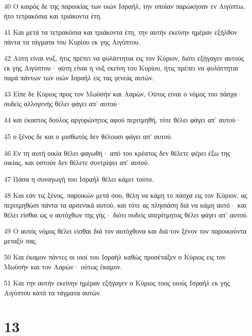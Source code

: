 \par 40 Ο καιρός δε της παροικίας των υιών Ισραήλ, την οποίαν παρώκησαν εν Αιγύπτω, ήτο τετρακόσια και τριάκοντα έτη.
\par 41 Και μετά τα τετρακόσια και τριάκοντα έτη, την αυτήν εκείνην ημέραν εξήλθον πάντα τα τάγματα του Κυρίου εκ γης Αιγύπτου.
\par 42 Αύτη είναι νυξ, ήτις πρέπει να φυλάττηται εις τον Κύριον, διότι εξήγαγεν αυτούς εκ γης Αιγύπτου· αύτη είναι η νυξ εκείνη του Κυρίου, ήτις πρέπει να φυλάττηται παρά πάντων των υιών Ισραήλ εις τας γενεάς αυτών.
\par 43 Είπε δε Κύριος προς τον Μωϋσήν και Ααρών, Ούτος είναι ο νόμος του πάσχα· ουδείς αλλογενής θέλει φάγει απ' αυτού·
\par 44 και έκαστος δούλος αργυρώνητος αφού περιτμηθή, τότε θέλει φάγει απ' αυτού·
\par 45 ο ξένος δε και ο μισθωτός δεν θέλουσι φάγει απ' αυτού.
\par 46 Εν τη αυτή οικία θέλει φαγωθή· από του κρέατος δεν θέλετε φέρει έξω της οικίας, και οστούν δεν θέλετε συντρίψει απ' αυτού.
\par 47 Πάσα η συναγωγή του Ισραήλ θέλει κάμει τούτο.
\par 48 Και εάν τις ξένος, παροικών μετά σου, θέλη να κάμη το πάσχα εις τον Κύριον, ας περιτμηθώσι πάντα τα αρσενικά αυτού, και τότε ας πλησιάση διά να κάμη αυτό· και θέλει είσθαι ως ο αυτόχθων της γής· διότι ουδείς απερίτμητος θέλει φάγει απ' αυτού.
\par 49 Ο αυτός νόμος θέλει είσθαι διά τον αυτόχθονα και διά τον ξένον τον παροικούντα μεταξύ σας.
\par 50 Και έκαμον πάντες οι υιοί του Ισραήλ καθώς προσέταξεν ο Κύριος εις τον Μωϋσήν και τον Ααρών· ούτως έκαμον.
\par 51 Και την αυτήν εκείνην ημέραν εξήγαγεν ο Κύριος τους υιούς Ισραήλ εκ γης Αιγύπτου κατά τα τάγματα αυτών.

\chapter{13}

